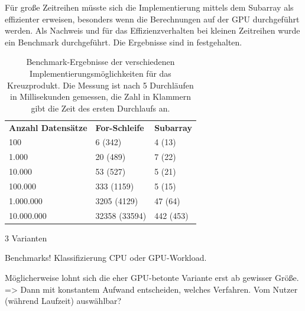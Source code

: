 \noindent Für große Zeitreihen müsste sich die Implementierung mittels dem Subarray als effizienter erweisen, besonders wenn die Berechnungen auf der \ac{GPU} durchgeführt werden.
Als Nachweis und für das Effizienzverhalten bei kleinen Zeitreihen wurde ein Benchmark durchgeführt.
Die Ergebnisse sind in  festgehalten.

\begin{table}[H]
	\centering
	\begin{tabular}{ | p{5cm} | p{3.5cm} | p{3.5cm} | }
		\hline \rowcolor{gray!15}
		\textbf{Anzahl Datensätze} & \textbf{For-Schleife} & \textbf{Subarray} \\ \hhline{|=|=|=|}
		100 & 6 (342) & 4 (13) \\ \hline
		1.000 & 20 (489) & 7 (22) \\ \hline
		10.000 & 53 (527) & 5 (21) \\ \hline
		100.000 & 333 (1159) & 5 (15) \\ \hline
		1.000.000 & 3205 (4129) & 47 (64) \\ \hline
		10.000.000 & 32358 (33594) & 442 (453) \\ \hline

	\end{tabular}
	\caption[Benchmark-Ergebnisse der verschiedenen Implementierungsmöglichkeiten für das Kreuzprodukt]
	{Benchmark-Ergebnisse der verschiedenen Implementierungsmöglichkeiten für das Kreuzprodukt. Die Messung ist nach 5 Durchläufen in Millisekunden gemessen, die Zahl in Klammern gibt die Zeit des ersten Durchlaufs an.}
	\label{tab:Benchmark_Kreuzprodukt_Implementierung}
\end{table}

3 Varianten

Benchmarks!
Klassifizierung \ac{CPU} oder \ac{GPU}-Workload.

Möglicherweise lohnt sich die eher \ac{GPU}-betonte Variante erst ab gewisser Größe.
=> Dann mit konstantem Aufwand entscheiden, welches Verfahren.
Vom Nutzer (während Laufzeit) auswählbar?
\endinput
